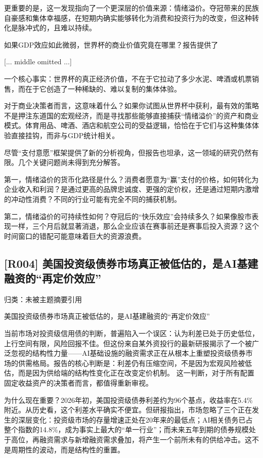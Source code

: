 \documentclass[11pt]{ctexart}
\begin{document}
更重要的是，这一发现指向了一个更深层的价值来源：情绪溢价。夺冠带来的民族自豪感和集体幸福感，在短期内确实能够转化为消费和投资行为的改变，但这种转化是脉冲式的，且难以持续。

如果GDP效应如此微弱，世界杯的商业价值究竟在哪里？报告提供了

[... middle omitted ...]

一个核心事实：世界杯的真正经济价值，不在于它拉动了多少水泥、啤酒或机票销售，而在于它创造了一种稀缺的、难以复制的集体体验。

对于商业决策者而言，这意味着什么？如果你试图从世界杯中获利，最有效的策略不是押注东道国的宏观经济，而是寻找那些能够直接捕获“情绪溢价”的资产和商业模式。体育用品、啤酒、酒店和航空公司的受益逻辑，恰恰在于它们与这种集体体验直接挂钩，而非与GDP统计相关。

尽管“支付意愿”框架提供了新的分析视角，但报告也坦承，这一领域的研究仍然有限。几个关键问题尚未得到充分解答。

第一，情绪溢价的货币化路径是什么？消费者愿意为“赢”支付的价格，如何转化为企业收入和利润？是通过更高的品牌忠诚度、更强的定价权，还是通过短期内激增的冲动性消费？不同的行业可能有完全不同的捕获机制。

第二，情绪溢价的可持续性如何？夺冠后的“快乐效应”会持续多久？如果像股市表现一样，三个月后就显著消退，那么企业应该在赛事前还是赛事后投入资源？这个时间窗口的错配可能意味着巨大的资源浪费。

\subsection{[R004] 美国投资级债券市场真正被低估的，是AI基建融资的“再定价效应”}
{\small\color{refgray}归类：未被主题摘要引用}

美国投资级债券市场真正被低估的，是AI基建融资的“再定价效应”

当前市场对投资级信用债的判断，普遍陷入一个误区：认为利差已处于历史低位，上行空间有限，风险回报不佳。但这份来自某外资投行的最新研报揭示了一个被广泛忽视的结构性力量——AI基础设施的融资需求正在从根本上重塑投资级债券市场的供需格局。报告的核心判断是：利差仍有压缩空间，不是因为宏观风险被低估，而是因为供给端的结构性变化正在改变定价机制。 这一判断，对于所有配置固定收益资产的决策者而言，都值得重新审视。

为什么现在重要？2026年初，美国投资级债券利差约为96个基点，收益率在5.4\%附近。从历史看，这个利差水平确实不便宜。但研报指出，市场忽略了三个正在发生的深层变化：投资级市场的存量增速正处在20年来的最低点；AI相关债务已占整个指数的14.8\%，成为事实上最大的“单一行业”；而未来五年到期的债券规模处于高位，再融资需求与新增融资需求叠加，将产生一个前所未有的供给冲击。这不是周期性的波动，而是结构性的重置。
\end{document}

